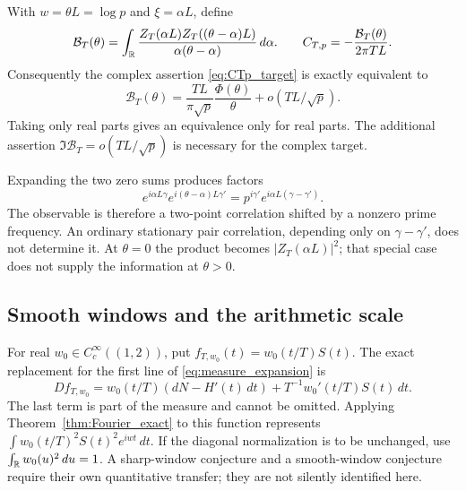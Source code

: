 \documentclass[11pt,reqno]{amsart}
\theoremstyle{plain}\newtheorem{theorem}{Theorem}[section]\newtheorem{proposition}[theorem]{Proposition}\newtheorem{lemma}[theorem]{Lemma}\newtheorem{corollary}[theorem]{Corollary}
\theoremstyle{definition}\newtheorem{hypothesis}[theorem]{Hypothesis}\newtheorem{definition}[theorem]{Definition}
\theoremstyle{remark}\newtheorem{remark}[theorem]{Remark}\newtheorem{experiment}[theorem]{Experiment}\newtheorem{question}[theorem]{Question}\newtheorem{heuristic}[theorem]{Heuristic}\newtheorem{conjecture}[theorem]{Conjecture}
\begin{document}
With $w=\theta L=\log p$ and $\xi=\alpha L$, define
\begin{equation}
 \mathcal B_T(\theta)=\int_\mathbb R
 \frac{Z_T(\alpha L)Z_T((\theta-\alpha)L)}{\alpha(\theta-\alpha)}\,d\alpha.
 \qquad C_{T,p}=-\frac{\mathcal B_T(\theta)}{2\pi TL}.
 \label{eq:BT_scaled}
\end{equation}
Consequently the complex assertion \eqref{eq:CTp_target} is exactly equivalent to
\begin{equation}
 \mathcal B_T(\theta)=\frac{TL}{\pi\sqrt p}\frac{\Phi(\theta)}{\theta}
                              +o(TL/\sqrt p).
 \label{eq:BT_target}
\end{equation}
Taking only real parts gives an equivalence only for real parts. The additional assertion $\Im\mathcal B_T=o(TL/\sqrt p)$ is necessary for the complex target.

Expanding the two zero sums produces factors
\begin{equation}
 e^{i\alpha L\gamma}e^{i(\theta-\alpha)L\gamma'}
        =p^{i\gamma'}e^{i\alpha L(\gamma-\gamma')}.
 \label{eq:shifted_pair_weight}
\end{equation}
The observable is therefore a two-point correlation shifted by a nonzero prime frequency. An ordinary stationary pair correlation, depending only on $\gamma-\gamma'$, does not determine it. At $\theta=0$ the product becomes $|Z_T(\alpha L)|^2$; that special case does not supply the information at $\theta>0$.

\subsection{Smooth windows and the arithmetic scale}
\label{subsec:smooth_windows}
For real $w_0\in C_c^\infty((1,2))$, put $f_{T,w_0}(t)=w_0(t/T)S(t)$. The exact replacement for the first line of \eqref{eq:measure_expansion} is
\begin{equation}
 Df_{T,w_0}=w_0(t/T)(dN-H'(t)\,dt)
             +T^{-1}w_0'(t/T)S(t)\,dt.
 \label{eq:smooth_measure}
\end{equation}
The last term is part of the measure and cannot be omitted. Applying Theorem~\ref{thm:Fourier_exact} to this function represents $\int w_0(t/T)^2S(t)^2e^{iwt}\,dt$. If the diagonal normalization is to be unchanged, use $\int_\mathbb R w_0(u)^2\,du=1$. A sharp-window conjecture and a smooth-window conjecture require their own quantitative transfer; they are not silently identified here.
\end{document}
